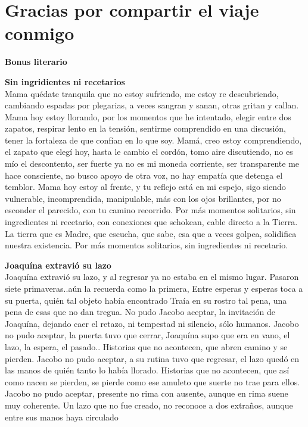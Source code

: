 \documentclass[12pt, a4paper, twoside]{book} %
\begin{document}
\chapter{Gracias por compartir el viaje conmigo}

\noindent\textbf{Bonus literario}\\

\clearpage

\noindent\textbf{Sin ingridientes ni recetarios}\\
Mama quédate tranquila que no estoy sufriendo, me estoy re descubriendo, cambiando espadas por plegarias, a veces sangran y sanan, otras gritan y callan.
Mama hoy estoy llorando, por los momentos que he intentado, elegir entre dos zapatos, respirar lento en la tensión, sentirme comprendido en una discusión, tener la fortaleza de que confían en lo que soy.
Mamá, creo estoy comprendiendo, el zapato que elegí hoy, hasta le cambio el cordón, tomo aire discutiendo, no es mío el descontento, ser fuerte ya no es mi moneda corriente, ser transparente me hace consciente, no busco apoyo de otra voz, no hay empatía que detenga el temblor.
Mama hoy estoy al frente, y tu reflejo está en mi espejo, sigo siendo vulnerable, incomprendida, manipulable, más con los ojos brillantes, por no esconder el parecido, con tu camino recorrido.
Por más momentos solitarios, sin ingredientes ni recetario, con conexiones que schokean, cable directo a la Tierra.
La tierra que es Madre, que escucha, que sabe, esa que a veces golpea, solidifica nuestra existencia.
Por más momentos solitarios, sin ingredientes ni recetario.

\clearpage

\noindent\textbf{Joaquína extravió su lazo}\\
Joaquína extravió su lazo, y al regresar ya no estaba en el mismo lugar.
Pasaron siete primaveras..aún la recuerda como la primera,
Entre esperas y esperas  toca a su puerta, quién tal objeto había encontrado
Traía en su rostro tal pena, una pena de esas que no dan tregua.
No pudo Jacobo aceptar, la invitación de Joaquína, dejando caer el retazo, ni tempestad ni silencio, sólo humanos.
Jacobo no pudo aceptar, la puerta tuvo que cerrar,
Joaquína supo que era en vano,  el lazo, la espera, el pasado..
Historias que no acontecen, que abren camino y se pierden.
Jacobo no pudo aceptar, a su rutina tuvo que regresar, el lazo quedó en las manos de quién tanto lo había llorado.
Historias que no acontecen, que así como nacen se pierden, se pierde como ese amuleto que suerte no trae para ellos.
Jacobo no pudo aceptar, presente no rima con ausente, aunque en rima suene muy coherente.
Un lazo que no fue creado, no reconoce a dos extraños, aunque entre sus manos  haya circulado
\end{document}

